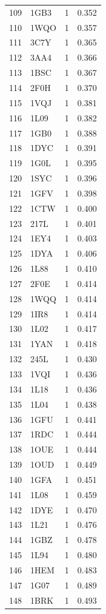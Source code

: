 \begin{longtable}{r l r r}
109 & 1GB3 & 1 & 0.352 \\
110 & 1WQO & 1 & 0.357 \\
111 & 3C7Y & 1 & 0.365 \\
112 & 3AA4 & 1 & 0.366 \\
113 & 1BSC & 1 & 0.367 \\
114 & 2F0H & 1 & 0.370 \\
115 & 1VQJ & 1 & 0.381 \\
116 & 1L09 & 1 & 0.382 \\
117 & 1GB0 & 1 & 0.388 \\
118 & 1DYC & 1 & 0.391 \\
119 & 1G0L & 1 & 0.395 \\
120 & 1SYC & 1 & 0.396 \\
121 & 1GFV & 1 & 0.398 \\
122 & 1CTW & 1 & 0.400 \\
123 & 217L & 1 & 0.401 \\
124 & 1EY4 & 1 & 0.403 \\
125 & 1DYA & 1 & 0.406 \\
126 & 1L88 & 1 & 0.410 \\
127 & 2F0E & 1 & 0.414 \\
128 & 1WQQ & 1 & 0.414 \\
129 & 1IR8 & 1 & 0.414 \\
130 & 1L02 & 1 & 0.417 \\
131 & 1YAN & 1 & 0.418 \\
132 & 245L & 1 & 0.430 \\
133 & 1VQI & 1 & 0.436 \\
134 & 1L18 & 1 & 0.436 \\
135 & 1L04 & 1 & 0.438 \\
136 & 1GFU & 1 & 0.441 \\
137 & 1RDC & 1 & 0.444 \\
138 & 1OUE & 1 & 0.444 \\
139 & 1OUD & 1 & 0.449 \\
140 & 1GFA & 1 & 0.451 \\
141 & 1L08 & 1 & 0.459 \\
142 & 1DYE & 1 & 0.470 \\
143 & 1L21 & 1 & 0.476 \\
144 & 1GBZ & 1 & 0.478 \\
145 & 1L94 & 1 & 0.480 \\
146 & 1HEM & 1 & 0.483 \\
147 & 1G07 & 1 & 0.489 \\
148 & 1BRK & 1 & 0.493 \\

\end{longtable}

